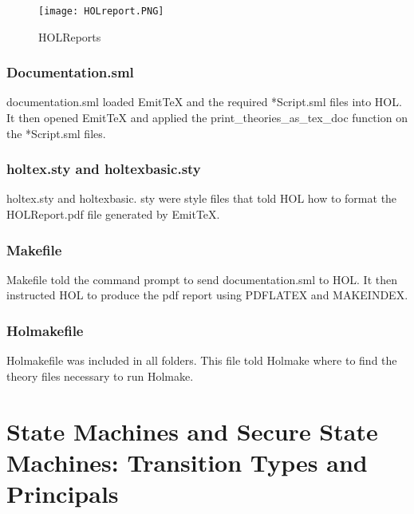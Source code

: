 \begin{figure}[h]
  \centering
  \texttt{[image: HOLreport.PNG]}
  \caption{HOLReports}
\end{figure}

\subsection*{Documentation.sml}
\label{sec:documentation.sml}

documentation.sml loaded EmitTeX and the required *Script.sml files into HOL.
It then opened EmitTeX and applied the print_theories_as_tex_doc function on the *Script.sml files.

\subsection*{holtex.sty and holtexbasic.sty}
\label{sec:holt-holt}

holtex.sty and holtexbasic. sty were style files that told HOL how to format the
HOLReport.pdf file generated by EmitTeX.

\subsection*{Makefile}
\label{sec:makefile}

Makefile told the command prompt to send documentation.sml to HOL.  It then
instructed HOL to produce the pdf report using PDFLATEX and MAKEINDEX.

\subsection*{Holmakefile}
\label{sec:holmakefile}

Holmakefile was included in all folders.  This file told Holmake where to
find the theory files necessary to run Holmake.  


\chapter{State Machines and Secure State Machines: Transition Types and Principals}
\label{cha:state-mach-secure}

